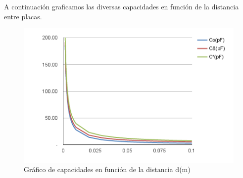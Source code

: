 \documentclass{article}
\begin{document}
A continuación graficamos las diversas capacidades en función de la distancia entre placas.

    \begin{figure}[H]
    \includegraphics[scale=0.75]{problema5.png}
    \caption{Gráfico de capacidades en función de la distancia d(m)}
    \label{fig:1}
    \end{figure}
\end{document}
